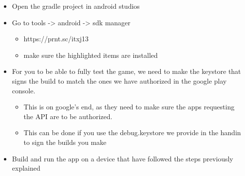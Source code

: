 \begin{itemize}
	\item Open the gradle project in android studios
	\item Go to tools -> android -> sdk manager
	\begin{itemize}
		\item https://prnt.sc/itxj13
		\item make sure the highlighted items are installed
	\end{itemize}
	\item For you to be able to fully test the game, we need to make the keystore that signs the build to match the ones we have authorized in the google play console.
	\begin{itemize}
		\item This is on google’s end, as they need to make sure the apps requesting the API are to be authorized.
		\item This can be done if you use the debug.keystore we provide in the handin to sign the builds you make
	\end{itemize}
	\item Build and run the app on a device that have followed the steps previously explained
\end{itemize}
